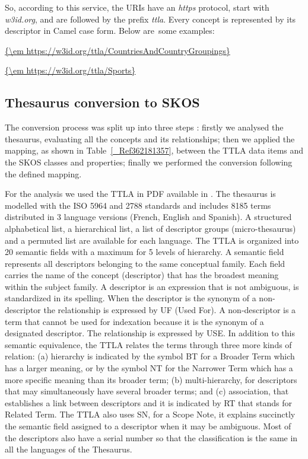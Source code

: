 \documentclass[runningheads,a4paper]{llncs}
\begin{document}
So, according to this service, the URIs have an {\em https} protocol, start with {\em w3id.org}, and are followed by the prefix {\em ttla}. Every concept is represented by its descriptor in Camel case form. Below are some examples: 

\url{{\em https://w3id.org/ttla/CountriesAndCountryGroupings}}

\url{{\em https://w3id.org/ttla/Sports}}

\subsection{Thesaurus conversion to SKOS}

The conversion process was split up into three steps  \cite{_Ref364511215}: firstly we analysed the thesaurus, evaluating all the concepts and its relationships; then we applied the mapping, as shown in Table~\ref{_Ref362181357}, between the TTLA data items and the SKOS classes and properties; finally we performed the conversion following the defined mapping.  

For the analysis we used the TTLA in PDF available in  \cite{_Ref364511122}. The thesaurus is modelled with the ISO 5964 and 2788 standards and includes 8185 terms distributed in 3 language versions (French, English and Spanish). A structured alphabetical list, a hierarchical list, a list of descriptor groups (micro-thesaurus) and a permuted list are available for each language. The TTLA is organized into 20 semantic fields with a maximum for 5 levels of hierarchy. A semantic field represents all descriptors belonging to the same conceptual family. Each field carries the name of the concept (descriptor) that has the broadest meaning within the subject family. A descriptor is an expression that is not ambiguous, is standardized in its spelling. When the descriptor is the synonym of a non-descriptor the relationship is expressed by UF (Used For). A non-descriptor is a term that cannot be used for indexation because it is the synonym of a designated descriptor. The relationship is expressed by USE. In addition to this semantic equivalence, the TTLA relates the terms through three more kinds of relation: (a) hierarchy is indicated by the symbol BT for a Broader Term which has a larger meaning, or by the symbol NT for the Narrower Term which has a more specific meaning than its broader term; (b) multi-hierarchy, for descriptors that may simultaneously have several broader terms; and (c) association, that establishes a link between descriptors and it is indicated by RT that stands for Related Term. The TTLA also uses SN, for a Scope Note, it explains succinctly the semantic field assigned to a descriptor when it may be ambiguous. Most of the descriptors also have a serial number so that the classification is the same in all the languages of the Thesaurus.
\end{document}
